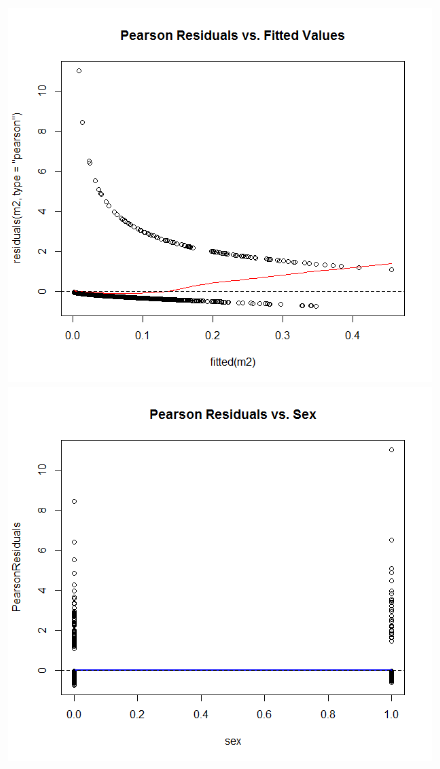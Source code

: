 \documentclass[11pt]{article}
\begin{document}
\begin{enumerate}
	\begin{figure}[H]
		\includegraphics[scale=0.4]{Rplot4-mean1}
		\includegraphics[scale=0.4]{Rplot4-mean2}

\end{figure}
\end{enumerate}
\end{document}
